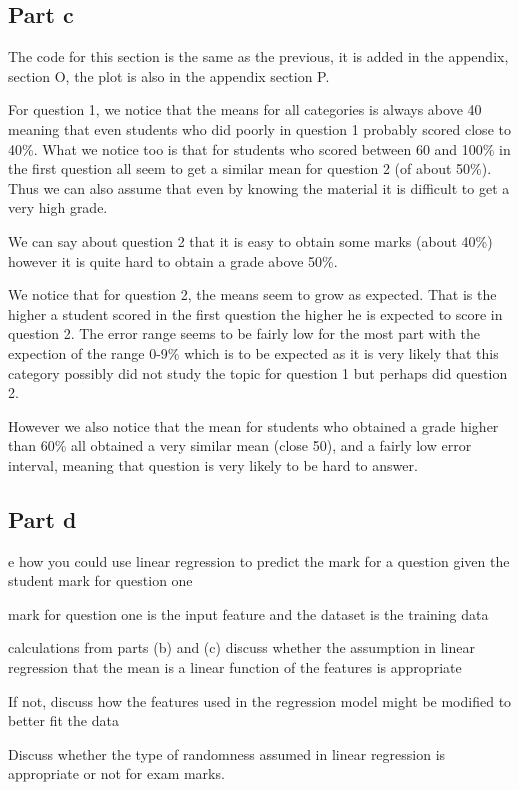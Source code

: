 \documentclass{article}
\begin{document}
\subsection*{Part c}
The code for this section is the same as the previous, it is added in the appendix, section O, the
plot is also in the appendix section P.

For question 1, we notice that the means for all categories is always above 40 meaning that even students
who did poorly in question 1 probably scored close to 40\%.
What we notice too is that for students who scored between 60 and 100\% in the first question all seem to get
a similar mean for question 2 (of about 50\%). Thus we can also assume that even by knowing the material it is
difficult to get a very high grade.

We can say about question 2 that it is easy to obtain some marks (about 40\%) however it is quite hard
to obtain a grade above 50\%.

We notice that for question 2, the means seem to grow as expected. That is the higher a student scored
in the first question the higher he is expected to score in question 2. The error range seems to be fairly
low for the most part with the expection of the range 0-9\% which is to be expected as it is very
likely that this category possibly did not study the topic for question 1 but perhaps did question 2.

However we also notice that the mean for students who obtained a grade higher than 60\% all obtained
a very similar mean (close 50), and a fairly low error interval, meaning that question is very likely
to be hard to answer.


\subsection*{Part d}
e how you could use linear regression to predict the mark for a question given
the student mark for question one

mark for question one is the input
feature and the dataset is the training data

calculations from parts
(b) and (c) discuss whether the assumption in linear regression that the mean is a
linear function of the features is appropriate

If not, discuss how the features used
in the regression model might be modified to better fit the data

Discuss whether
the type of randomness assumed in linear regression is appropriate or not for exam
marks. 
\end{document}

